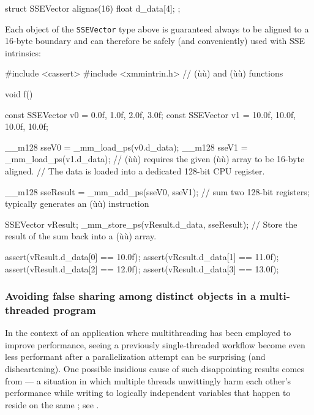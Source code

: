 \begin{emcppslisting}
struct SSEVector
{
    alignas(16) float d_data[4];
};
\end{emcppslisting}
    
\noindent Each object of the \lstinline!SSEVector! type above is guaranteed always to
be aligned to a 16-byte boundary and can therefore be safely (and
conveniently) used with SSE intrinsics:

\begin{emcppslisting}
#include <cassert>                                                              
#include <xmmintrin.h> // (ù{}ù) and (ù{}ù) functions

void f()
{
    const SSEVector v0 = {0.0f, 1.0f, 2.0f, 3.0f};
    const SSEVector v1 = {10.0f, 10.0f, 10.0f, 10.0f};

    __m128 sseV0 = _mm_load_ps(v0.d_data);
    __m128 sseV1 = _mm_load_ps(v1.d_data);
        // (ù{}ù) requires the given (ù{}ù) array to be 16-byte aligned.
        // The data is loaded into a dedicated 128-bit CPU register.

    __m128 sseResult = _mm_add_ps(sseV0, sseV1);
        // sum two 128-bit registers; typically generates an (ù{}ù) instruction

    SSEVector vResult;
    _mm_store_ps(vResult.d_data, sseResult);
        // Store the result of the sum back into a (ù{}ù) array.

    assert(vResult.d_data[0] == 10.0f);
    assert(vResult.d_data[1] == 11.0f);
    assert(vResult.d_data[2] == 12.0f);
    assert(vResult.d_data[3] == 13.0f);
}
\end{emcppslisting}
    

\subsubsection[Avoiding false sharing among distinct objects in a multi-threaded program]{Avoiding false sharing among distinct objects in a multi-threaded program}\label{avoiding-false-sharing-among-distinct-objects-in-a-multi-threaded-program}

In the context of an application where multithreading has been employed
to improve performance, seeing 
a previously single-threaded workflow become even less performant after
a parallelization attempt can be surprising (and disheartening). One possible insidious cause of such
disappointing results comes from  --- a situation
in which multiple threads unwittingly harm each other's performance
while writing to logically independent variables that happen to reside
on the same ; see .

